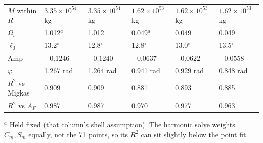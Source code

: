 \documentclass[10pt]{article}
\begin{document}
{\begin{center}
\begin{tabular}{llllll}
$M$ within $R$ & $3.35{\times}10^{54}$ kg & $3.35{\times}10^{54}$ kg & $1.62{\times}10^{53}$ kg & $1.62{\times}10^{53}$ kg & $1.62{\times}10^{53}$ kg\\
$\Omega_s$ & 1.012$^a$ & 1.012 & 0.049$^a$ & 0.049 & 0.049\\
$\ell_0$ & 13.2$^\circ$ & 12.8$^\circ$ & 12.8$^\circ$ & 13.0$^\circ$ & 13.5$^\circ$\\
Amp & $-0.1246$ & $-0.1240$ & $-0.0637$ & $-0.0622$ & $-0.0558$\\
$\varphi$ & 1.267 rad & 1.264 rad & 0.941 rad & 0.929 rad & 0.848 rad\\
$R^2$ vs Migkas & 0.909 & 0.909 & 0.881 & 0.893 & 0.885\\
$R^2$ vs $A_F$ & 0.987 & 0.987 & 0.970 & 0.977 & 0.963\\
\bottomrule
\end{tabular}\end{center}
\vspace{-3pt}
{\footnotesize $^a$ Held fixed (that column's shell assumption). The harmonic solve weights $C_m,S_m$ equally, not the 71 points, so its $R^2$ can sit slightly below the point fit.}


}
\end{document}
